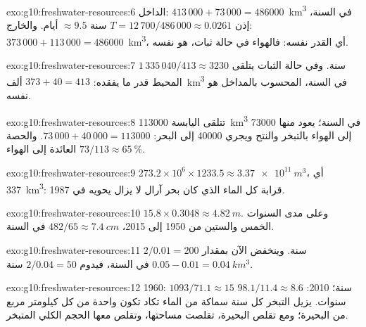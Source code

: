\begin{solution}{exo:g10:freshwater-resources:6}
الداخل: $413\,000 + 73\,000 = \num{486000}$~\unit{km^3} في السنة، إذن
$T = 12\,700/486\,000 \approx \num{0.0261}$ سنة $\approx \num{9.5}$ أيام.
والخارج: $373\,000 + 113\,000 = \num{486000}$~\unit{km^3}، أي القدر نفسه: فالهواء في
حالة ثبات،  هو نفسه.
\end{solution}

\begin{solution}{exo:g10:freshwater-resources:7}
$1\,335\,040/413 \approx \num{3230}$ سنة. وفي حالة الثبات يتلقى المحيط
قدر ما يفقده: $373 + 40 = 413$ ألف~\unit{km^3} في السنة،
 المحسوب بالمداخل هو نفسه.
\end{solution}

\begin{solution}{exo:g10:freshwater-resources:8}
تتلقى اليابسة \num{113000}~\unit{km^3} في السنة؛ يعود منها \num{73000} إلى
الهواء بالتبخر والنتح ويجري \num{40000} إلى البحر:
$73\,000 + 40\,000 = \num{113000}$. والحصة العائدة إلى الهواء
$73/113 \approx \qty{65}{\percent}$.
\end{solution}

\begin{solution}{exo:g10:freshwater-resources:9}
$273.2 \times 10^6 \times 1233.5 \approx \qty{3.37e11}{m^3}$، أي
\qty{337}{km^3}: قرابة كل الماء الذي كان بحر آرال لا يزال يحويه في
1987.
\end{solution}

\begin{solution}{exo:g10:freshwater-resources:10}
$15.8 \times 0.3048 \approx \qty{4.82}{m}$. وعلى مدى السنوات الخمس والستين من 1950 إلى
2015، $482/65 \approx \qty{7.4}{cm}$ في السنة.
\end{solution}

\begin{solution}{exo:g10:freshwater-resources:11}
$2/0.01 = 200$ سنة. وينخفض  الآن بمقدار $0.05 - 0.01 =
\qty{0.04}{km^3}$ في السنة، فيدوم $2/0.04 = 50$ سنة.
\end{solution}

\begin{solution}{exo:g10:freshwater-resources:12}
1960: $1093/71.1 \approx 15$ سنة؛ 2010: $98.1/11.4 \approx 8.6$ سنوات.
يزيل التبخر كل سنة سماكة من الماء تكاد تكون واحدة من كل كيلومتر مربع من
البحيرة؛ ومع تقلص البحيرة، تقلصت مساحتها، وتقلص معها الحجم الكلي المتبخر.
\end{solution}

